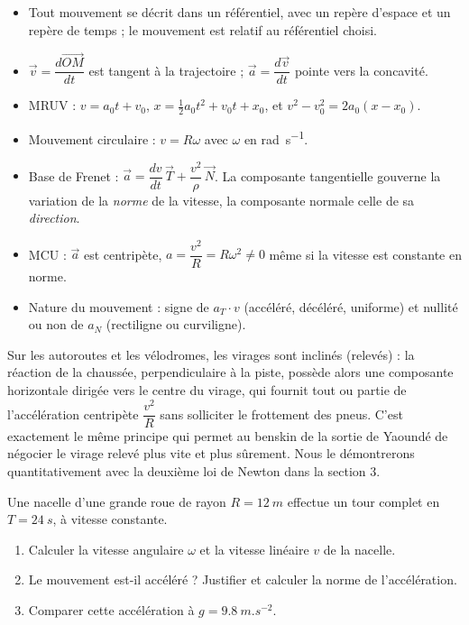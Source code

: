 \documentclass[11pt]{article}
\newcommand{\cle}[1]{{\popxbold\color{popdark}#1}}
\begin{document}
\begin{aretenir}
\begin{itemize}
\item Tout mouvement se décrit dans un \cle{référentiel}, avec un repère d'espace et un repère de temps ; le mouvement est relatif au référentiel choisi.
\item $\vec{v} = \dfrac{d\overrightarrow{OM}}{dt}$ est tangent à la trajectoire ; $\vec{a} = \dfrac{d\vec{v}}{dt}$ pointe vers la concavité.
\item MRUV : $v = a_0 t + v_0$, $x = \tfrac{1}{2}a_0 t^2 + v_0 t + x_0$, et $v^2 - v_0^2 = 2a_0(x-x_0)$.
\item Mouvement circulaire : $v = R\omega$ avec $\omega$ en \si{rad.s^{-1}}.
\item Base de Frenet : $\vec{a} = \dfrac{dv}{dt}\,\vec{T} + \dfrac{v^2}{\rho}\,\vec{N}$. La composante tangentielle gouverne la variation de la \emph{norme} de la vitesse, la composante normale celle de sa \emph{direction}.
\item MCU : $\vec{a}$ est centripète, $a = \dfrac{v^2}{R} = R\omega^2 \neq 0$ même si la vitesse est constante en norme.
\item Nature du mouvement : signe de $a_T \cdot v$ (accéléré, décéléré, uniforme) et nullité ou non de $a_N$ (rectiligne ou curviligne).
\end{itemize}
\end{aretenir}

\begin{savaistu}
Sur les autoroutes et les vélodromes, les virages sont inclinés (relevés) : la réaction de la chaussée, perpendiculaire à la piste, possède alors une composante horizontale dirigée vers le centre du virage, qui fournit tout ou partie de l'accélération centripète $\dfrac{v^2}{R}$ sans solliciter le frottement des pneus. C'est exactement le même principe qui permet au benskin de la sortie de Yaoundé de négocier le virage relevé plus vite et plus sûrement. Nous le démontrerons quantitativement avec la deuxième loi de Newton dans la section 3.
\end{savaistu}

\begin{exercice}
Une nacelle d'une grande roue de rayon $R = \SI{12}{m}$ effectue un tour complet en $T = \SI{24}{s}$, à vitesse constante.
\begin{enumerate}
\item Calculer la vitesse angulaire $\omega$ et la vitesse linéaire $v$ de la nacelle.
\item Le mouvement est-il accéléré ? Justifier et calculer la norme de l'accélération.
\item Comparer cette accélération à $g = \SI{9,8}{m.s^{-2}}$.
\end{enumerate}
\end{exercice}
\end{document}
